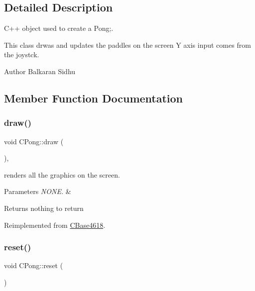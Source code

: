 \subsection{Detailed Description}
C++ object used to create a Pong;. 

This class drwas and updates the paddles on the screen Y axis input comes from the joystck.

\begin{DoxyAuthor}{Author}
Balkaran Sidhu 
\end{DoxyAuthor}


\subsection{Member Function Documentation}
\hypertarget{class_c_pong_af43dbb61f1f1addd6920b01aeca3fa63}{}\label{class_c_pong_af43dbb61f1f1addd6920b01aeca3fa63} 
\subsubsection{\texorpdfstring{draw()}{draw()}}
{\footnotesize\ttfamily void C\+Pong\+::draw (\begin{DoxyParamCaption}{ }\end{DoxyParamCaption})\hspace{0.3cm}{\ttfamily [override]}, {\ttfamily [virtual]}}



renders all the graphics on the screen. 


\begin{DoxyParams}{Parameters}
{\em N\+O\+N\+E.} & \\
\hline
\end{DoxyParams}
\begin{DoxyReturn}{Returns}
nothing to return 
\end{DoxyReturn}


Reimplemented from \hyperlink{class_c_base4618_a853327d563d064bb31db241861c4d291}{C\+Base4618}.

\hypertarget{class_c_pong_a0fa724d6d3dc8e65decb1276a4a1c38a}{}\label{class_c_pong_a0fa724d6d3dc8e65decb1276a4a1c38a} 
\subsubsection{\texorpdfstring{reset()}{reset()}}
{\footnotesize\ttfamily void C\+Pong\+::reset (\begin{DoxyParamCaption}{ }\end{DoxyParamCaption})}



